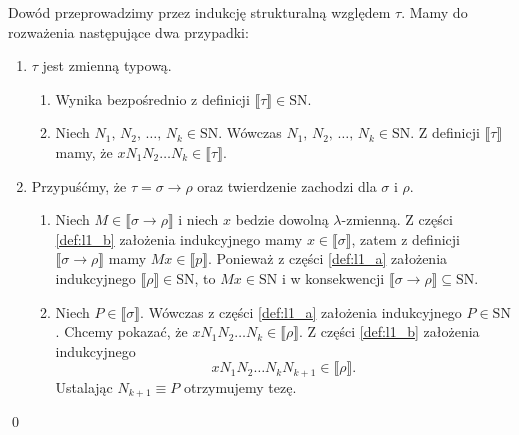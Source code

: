 \begin{dowod}
  Dowód przeprowadzimy przez indukcję strukturalną względem \(\tau\). Mamy do rozważenia następujące dwa przypadki:
  \begin{enumerate}[label=(\alph*)]
    \setlength\itemsep{0em}
    \item \(\tau\) jest zmienną typową.
     \begin{enumerate}[label=(\arabic*)]
      \setlength\itemsep{0em}
     
        \item Wynika bezpośrednio z definicji \(\llbracket \tau \rrbracket\in \mathrm{SN}\). 
         
        \item Niech \(N_1,\,N_2,\,\dots,\,N_k \in \mathrm{SN}\). Wówczas \(N_1,\,N_2,\,\dots,\,N_k\in\mathrm{SN}\). Z definicji \(\llbracket \tau \rrbracket\) mamy, że \(xN_1 N_2 \dots N_k \in\llbracket \tau \rrbracket\).
      \end{enumerate}

    \item Przypuśćmy, że \(\tau=\sigma\to\rho\) oraz twierdzenie zachodzi dla \(\sigma\) i \(\rho\).
    \begin{enumerate}[label=(\arabic*)]
    \setlength\itemsep{0em}

    \item Niech \(M\in\llbracket \sigma \to \rho\rrbracket\) i niech \(x\) bedzie dowolną \(\lambda\)-zmienną. Z części \ref{def:l1_b} założenia indukcyjnego mamy \(x\in\llbracket \sigma \rrbracket\), zatem z definicji \(\llbracket \sigma\to\rho\rrbracket\) mamy \(Mx\in\llbracket p\rrbracket\). Ponieważ z części \ref{def:l1_a} założenia indukcyjnego \(\llbracket\rho\rrbracket\in\mathrm{SN}\), to \(Mx\in\mathrm{SN}\) i w konsekwencji \(\llbracket\sigma\to\rho\rrbracket\subseteq \mathrm{SN}\).
    \item Niech \(P\in\llbracket \sigma \rrbracket\). Wówczas z części \ref{def:l1_a} założenia indukcyjnego \(P\in\mathrm{SN}\). Chcemy pokazać, że \(xN_1 N_2 \dots N_k \in \llbracket \rho \rrbracket\). Z części \ref{def:l1_b} założenia indukcyjnego \[xN_1 N_2 \dots N_k N_{k+1} \in \llbracket \rho \rrbracket.\] Ustalając \(N_{k+1}\equiv P\) otrzymujemy tezę.
     \end{enumerate}
  \end{enumerate}
  \qed
\end{dowod}

